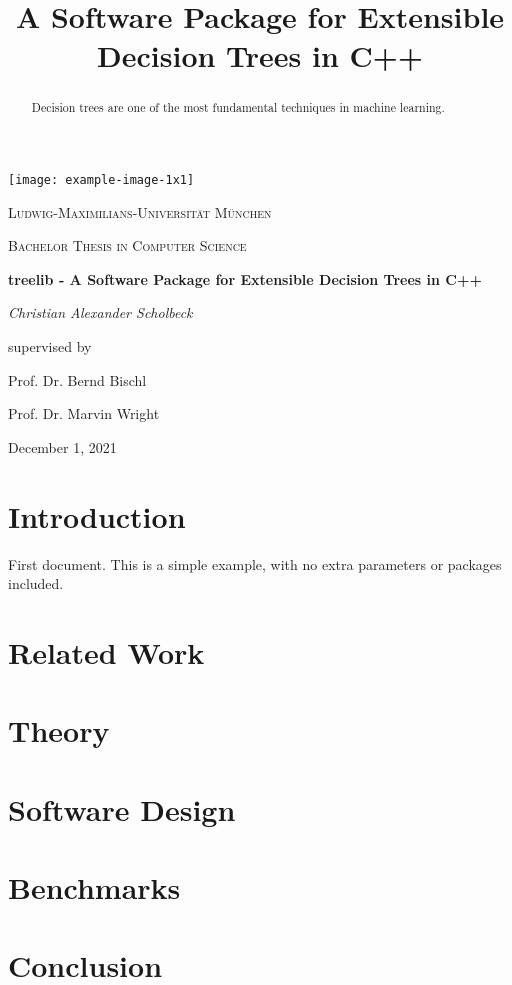 \documentclass[a4paper, 11pt]{article}
\begin{document}
\title{A Software Package for Extensible Decision Trees in C++}

\begin{titlepage}
	\centering
	\texttt{[image: example-image-1x1]}\par\vspace{1cm}
	{\scshape\LARGE Ludwig-Maximilians-Universität München \par}
	\vspace{1cm}
	{\scshape\Large Bachelor Thesis in Computer Science\par}
	\vspace{1.5cm}
	{\huge\bfseries treelib - A Software Package for Extensible Decision Trees in C++\par}
	\vspace{2cm}
	{\Large\itshape Christian Alexander Scholbeck\par}
	\vfill
	supervised by\par
	Prof. Dr. Bernd Bischl \par
	Prof. Dr. Marvin Wright

	\vfill

	{\large December 1, 2021 \par}
\end{titlepage}

\begin{abstract}
Decision trees are one of the most fundamental techniques in machine learning.
\end{abstract}


\section{Introduction}
First document. This is a simple example, with no 
extra parameters or packages included.


\section{Related Work}

\section{Theory}

\section{Software Design}

\section{Benchmarks}

\section{Conclusion}
\end{document}
